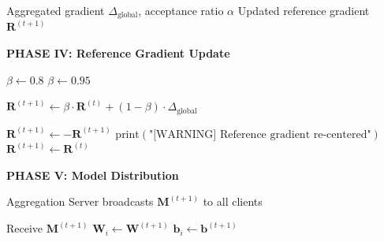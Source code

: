 \documentclass[10pt,journal,compsoc]{IEEEtran}
\begin{document}
\begin{algorithm}[H]
\caption{FIP-FL Per-Round Verification Protocol (Part 5: Reference Update)}
\label{alg:round5}
\begin{algorithmic}[1]
\Require Aggregated gradient $\Delta_{\text{global}}$, acceptance ratio $\alpha$
\Ensure Updated reference gradient $\mathbf{R}^{(t+1)}$

\Statex \textbf{PHASE IV: Reference Gradient Update}

        \State $\beta \gets 0.8$ 
    \Else
        \State $\beta \gets 0.95$ 
    \EndIf
    
    \State $\mathbf{R}^{(t+1)} \gets \beta \cdot \mathbf{R}^{(t)} + (1 - \beta) \cdot \Delta_{\text{global}}$
    
        \State $\mathbf{R}^{(t+1)} \gets -\mathbf{R}^{(t+1)}$
        \State $\text{print}(\text{"[WARNING] Reference gradient re-centered"})$
    \EndIf
\Else
    \State $\mathbf{R}^{(t+1)} \gets \mathbf{R}^{(t)}$
\EndIf

\Statex \textbf{PHASE V: Model Distribution}

\State Aggregation Server broadcasts $\mathbf{M}^{(t+1)}$ to all clients

    \State Receive $\mathbf{M}^{(t+1)}$
    \State $\mathbf{W}_i \gets \mathbf{W}^{(t+1)}$
    \State $\mathbf{b}_i \gets \mathbf{b}^{(t+1)}$
\EndFor
\end{algorithmic}
\end{algorithm}
\end{document}
